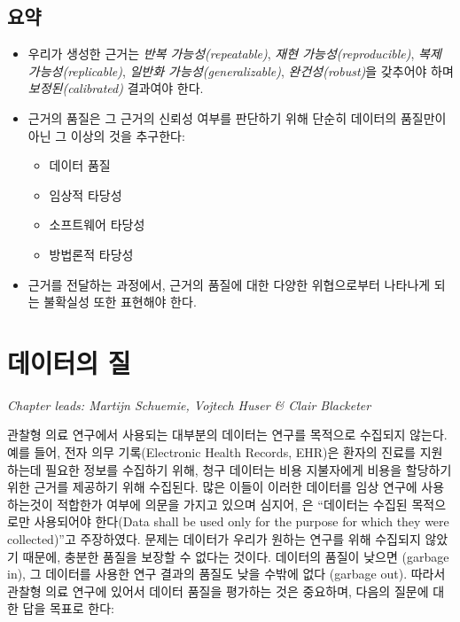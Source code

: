 \documentclass[11pt]{book}
\providecommand{\tightlist}{%
  \setlength{\itemsep}{0pt}\setlength{\parskip}{0pt}}
\theoremstyle{definition}
\theoremstyle{definition}
\theoremstyle{definition}
\theoremstyle{remark}
\let\BeginKnitrBlock\begin \let\EndKnitrBlock\end
\begin{document}
\section{요약}\label{-12}

\BeginKnitrBlock{rmdsummary}
\begin{itemize}
\item
  우리가 생성한 근거는 \emph{반복 가능성(repeatable)}, \emph{재현
  가능성(reproducible)}, \emph{복제 가능성(replicable)}, \emph{일반화
  가능성(generalizable)}, \emph{완건성(robust)}을 갖추어야 하며
  \emph{보정된(calibrated)} 결과여야 한다.
\item
  근거의 품질은 그 근거의 신뢰성 여부를 판단하기 위해 단순히 데이터의
  품질만이 아닌 그 이상의 것을 추구한다:

  \begin{itemize}
  \tightlist
  \item
    데이터 품질
  \item
    임상적 타당성
  \item
    소프트웨어 타당성
  \item
    방법론적 타당성
  \end{itemize}
\item
  근거를 전달하는 과정에서, 근거의 품질에 대한 다양한 위협으로부터
  나타나게 되는 불확실성 또한 표현해야 한다.
\end{itemize}
\EndKnitrBlock{rmdsummary}

\chapter{데이터의 질}\label{DataQuality}

\emph{Chapter leads: Martijn Schuemie, Vojtech Huser \& Clair Blacketer}

관찰형 의료 연구에서 사용되는 대부분의 데이터는 연구를 목적으로 수집되지
않는다. 예를 들어, 전자 의무 기록(Electronic Health Records, EHR)은
환자의 진료를 지원하는데 필요한 정보를 수집하기 위해, 청구 데이터는 비용
지불자에게 비용을 할당하기 위한 근거를 제공하기 위해 수집된다. 많은
이들이 이러한 데이터를 임상 연구에 사용하는것이 적합한가 여부에 의문을
가지고 있으며 심지어, \citet{vanDerLei_1991} 은 ``데이터는 수집된
목적으로만 사용되어야 한다(Data shall be used only for the purpose for
which they were collected)''고 주장하였다. 문제는 데이터가 우리가 원하는
연구를 위해 수집되지 않았기 때문에, 충분한 품질을 보장할 수 없다는
것이다. 데이터의 품질이 낮으면 (garbage in), 그 데이터를 사용한 연구
결과의 품질도 낮을 수밖에 없다 (garbage out). 따라서 관찰형 의료 연구에
있어서 데이터 품질을 평가하는 것은 중요하며, 다음의 질문에 대한 답을
목표로 한다:
\end{document}
